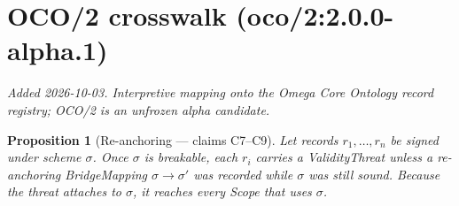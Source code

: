 \documentclass{article}
\newtheorem{proposition}{Proposition}
\begin{document}
\section{OCO/2 crosswalk (oco/2:2.0.0-alpha.1)}
\emph{Added 2026-10-03. Interpretive mapping onto the Omega Core Ontology
record registry; OCO/2 is an unfrozen alpha candidate.}

\begin{proposition}[Re-anchoring --- claims C7--C9]
Let records $r_1,\dots,r_n$ be signed under scheme $\sigma$. Once $\sigma$ is breakable, each $r_i$ carries a ValidityThreat unless a re-anchoring BridgeMapping $\sigma\to\sigma'$ was recorded while $\sigma$ was still sound. Because the threat attaches to $\sigma$, it reaches every Scope that uses $\sigma$.
\end{proposition}
\end{document}
